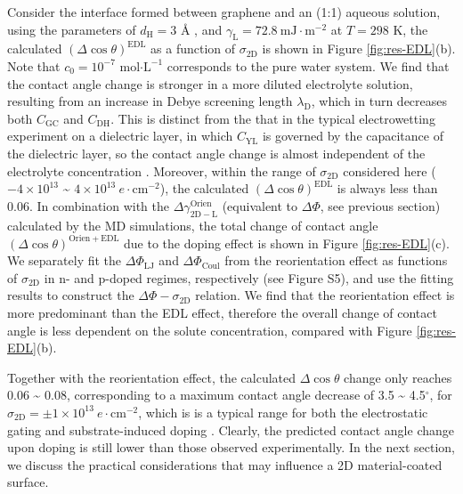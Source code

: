 \documentclass[journal=ancac3,manuscript=article,email=true,hyperref=true,keywords=true]{achemso}
\begin{document}
Consider the interface formed between graphene and an (1:1) aqueous
solution, using the parameters of \(d_{\mathrm{H}}=3\) Å
\cite{mcclendon_thickness_1927}, and \(\gamma_{\mathrm{L}}=72.8\
\mathrm{mJ}\cdot \mathrm{m}^{-2}\) at \(T=298\) K, the calculated
\((\Delta \cos \theta)^{\mathrm{EDL}}\) as a function of
\(\sigma_{\mathrm{2D}}\) is shown in Figure \ref{fig:res-EDL}(b).  Note
that \(c_{0}=10^{-7}\) mol\(\cdot \mathrm{L}^{-1}\) corresponds to the
pure water system. We find that the contact angle change is stronger
in a more diluted electrolyte solution, resulting from an increase in
Debye screening length \(\lambda_{\mathrm{D}}\), which in turn decreases
both \(C_{\mathrm{GC}}\) and \(C_{\mathrm{DH}}\). This is distinct from
the that in the typical electrowetting experiment on a dielectric
layer, in which \(C_{\mathrm{YL}}\) is governed by the capacitance of
the dielectric layer, so the contact angle change is almost
independent of the electrolyte concentration
\cite{Mugele_2005}. Moreover, within the range of \(\sigma_{\mathrm{2D}}\)
considered here (\(-4\times10^{13}\) \textasciitilde{} \(4\times10^{13}\ e\cdot
\mathrm{cm}^{-2}\)), the calculated \((\Delta \cos
\theta)^{\mathrm{EDL}}\) is always less than 0.06.  In combination with
the \(\Delta \gamma^{\mathrm{Orien}}_{\mathrm{2D-L}}\) (equivalent to
\(\Delta \Phi\), see previous section) calculated by the MD simulations,
the total change of contact angle \((\Delta \cos
\theta)^{\mathrm{Orien + EDL}}\) due to the doping effect is shown in
Figure \ref{fig:res-EDL}(c). We separately fit the \(\Delta
\Phi_{\mathrm{LJ}}\) and \(\Delta \Phi_{\mathrm{Coul}}\) from the
reorientation effect as functions of \(\sigma_{\mathrm{2D}}\) in n- and
p-doped regimes, respectively (see Figure S5), and use the fitting
results to construct the \(\Delta \Phi-\sigma_{\mathrm{2D}}\)
relation. We find that the reorientation effect is more predominant
than the EDL effect, therefore the overall change of contact angle is
less dependent on the solute concentration, compared with Figure
\ref{fig:res-EDL}(b).

Together with the reorientation effect, the calculated \(\Delta \cos
\theta\) change only reaches 0.06 \textasciitilde{} 0.08, corresponding to a maximum
contact angle decrease of 3.5 \textasciitilde{} 4.5\(^{\circ}\), for
\(\sigma_{\mathrm{2D}}=\pm1\times10^{13}\ e\cdot \mathrm{cm}^{-2}\),
which is is a typical range for both the electrostatic gating
\cite{hong_mechanism_2016} and substrate-induced doping
\cite{ashraf_doping-induced_2016}. Clearly, the predicted contact angle
change upon doping is still lower than those observed
experimentally. In the next section, we discuss the practical
considerations that may influence a 2D material-coated surface.
\end{document}
